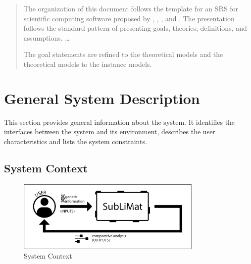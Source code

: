 \documentclass[12pt]{article}
\begin{document}
\begin{quote}
The organization of this document follows the template for an SRS for scientific 
computing software proposed by \cite{koothoor2013}, \cite{smithLai2005}, 
\cite{smithEtAl2007}, and \cite{smithKoothoor2016}. The presentation follows 
the standard pattern of presenting goals, theories, definitions, and assumptions.
\dots


The goal statements are refined to the theoretical models and the theoretical 
models to the instance models.
\end{quote}

\section{General System Description}

This section provides general information about the system.  It identifies the
interfaces between the system and its environment, describes the user
characteristics and lists the system constraints.

\subsection{System Context}


\begin{figure}[h!]
\begin{center}
 \includegraphics[width=0.8\textwidth]{sublimat_SystemContextFigure}
\caption{System Context}
\label{Fig_SystemContext} 
\end{center}
\end{figure}
\end{document}
